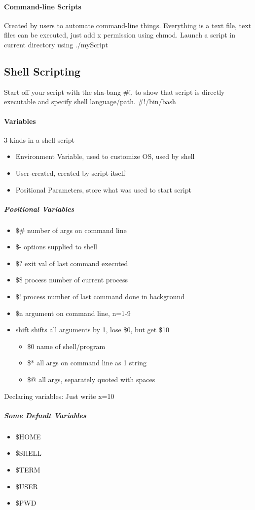 \documentclass[12 pt]{article}
\begin{document}
	\paragraph{Command-line Scripts} Created by users to automate command-line things. Everything is a text file, text files can be executed, just add x permission using chmod. Launch a script in current directory using ./myScript
	\subsection{Shell Scripting}
	Start off your script with the sha-bang \#!, to show that script is directly executable and specify shell language/path. \#!/bin/bash
	\paragraph{Variables} 3 kinds in a shell script
	\begin{itemize}
		\item Environment Variable, used to customize OS, used by shell
		\item User-created, created by script itself
		\item Positional Parameters, store what was used to start script
		\end{itemize}
		\subparagraph{Positional Variables}
		\begin{itemize}
			\item \$\# number of args on command line
			\item \$- options supplied to shell
			\item \$? exit val of last command executed
			\item \$\$ process number of current process
			\item \$! process number of last command done in background
			\item \$n argument on command line, n=1-9
			\item shift shifts all arguments by 1, lose \$0, but get \$10 
			\begin{itemize}
				\item \$0 name of shell/program
				\item \$* all args on command line as 1 string
				\item \$@ all args, separately quoted with spaces
			\end{itemize}
			\end{itemize}
			Declaring variables: Just write x=10
			\subparagraph{Some Default Variables}
			\begin{itemize}
				\item \$HOME
				\item \$SHELL
				\item \$TERM
				\item \$USER
				\item \$PWD
				\end{itemize} 
\end{document}
